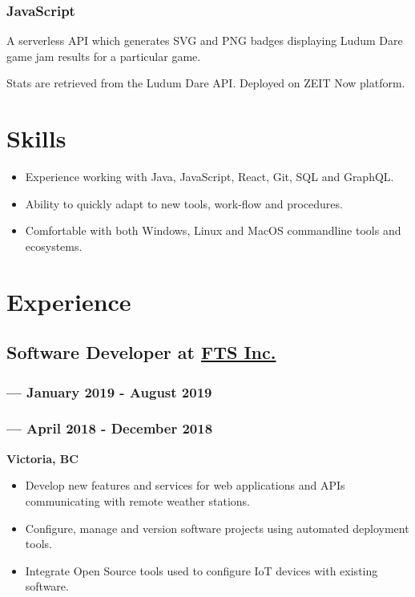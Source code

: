 \documentclass[letterpaper]{article}
\begin{document}
\subsubsection{JavaScript}
\label{sec:org9a1b5cc}
A serverless API which generates SVG and PNG badges displaying Ludum Dare game jam results for a particular game.

Stats are retrieved from the Ludum Dare API.  Deployed on ZEIT Now platform.
\section{Skills}
\label{sec:org6bcf5ef}
\begin{itemize}
\item Experience working with Java, JavaScript, React, Git, SQL and GraphQL.
\item Ability to quickly adapt to new tools, work-flow and procedures.
\item Comfortable with both Windows, Linux and MacOS commandline tools and ecosystems.
\end{itemize}
\toggleurlstyle
\section{Experience}
\label{sec:org7b1dde8}
\subsection{Software Developer at \href{https://ftsinc.com}{FTS Inc.}}
\label{sec:org184c1c4}
\vspace{-2.4ex}
\subsubsection{ --- January 2019 - August 2019}
\label{sec:org82b72ef}
\vspace{2.4ex}
\subsubsection{ --- April 2018 - December 2018}
\label{sec:org7d940d8}
\vspace{-1ex}
\textbf{Victoria, BC}
\begin{itemize}
\item Develop new features and services for web applications and APIs communicating with remote weather stations.
\item Configure, manage and version software projects using automated deployment tools.
\item Integrate Open Source tools used to configure IoT devices with existing software.
\end{itemize}
\end{document}
